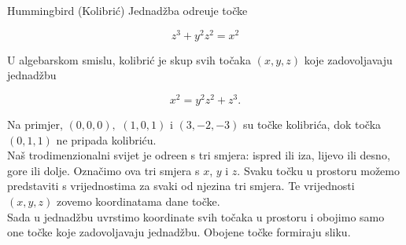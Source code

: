 \begin{surferPage}{Hummingbird (Kolibri\'{c})}
Jednad\v{z}ba odre\dj{}uje to\v{c}ke \\

  \smallskip

\[z^3+ y^2	z^2	= x^2\]

\singlespacing
U algebarskom smislu, kolibri\'{c} je skup svih to\v{c}aka $(x, y, z)$ koje zadovoljavaju jednad\v{z}bu

\smallskip

\[ x^2= y^2z^2+z^3.\]

\smallskip
Na primjer, $(0,0,0),$ $(1,0,1)$ i $(3,-2,-3)$ su to\v{c}ke kolibri\'{c}a, dok to\v{c}ka $(0,1,1)$ ne pripada 
kolibri\'{c}u.\\
 \singlespacing
Na\v{s} trodimenzionalni svijet je odre\dj{}en s tri smjera: ispred ili iza, lijevo ili desno, gore ili dolje. Ozna\v{c}imo ova tri smjera s $x$, $y$ i $z$. Svaku to\v{c}ku u prostoru mo\v{z}emo predstaviti s vrijednostima za svaki od njezina tri smjera. Te vrijednosti $(x,y,z)$ zovemo koordinatama dane to\v{c}ke.  \\
\singlespacing
Sada u jednad\v{z}bu uvrstimo koordinate svih to\v{c}aka u prostoru i obojimo samo one to\v{c}ke koje zadovoljavaju jednad\v{z}bu. Obojene to\v{c}ke formiraju sliku.
\end{surferPage}
